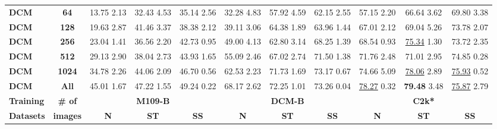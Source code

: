 \documentclass{article}
\begin{document}
\begin{table*}
\begin{tabular}{l|c|ccc|ccc|ccc}
    \noalign{\smallskip}
    \hline
    \noalign{\smallskip}
    
    \textbf{DCM} & \textbf{64}   
    & 13.75 {\tiny 2.13} 
    & 32.43 {\tiny 4.53} 
    & {35.14} {\tiny 2.56} 
    & 32.28 {\tiny 4.83} 
    & 57.92 {\tiny 4.59} 
    & {62.15} {\tiny 2.55} 
    & 57.15 {\tiny 2.20} 
    & 66.64 {\tiny 3.62} 
    & {69.80} {\tiny 3.38} \\
    \textbf{DCM} & \textbf{128}
    & 19.63 {\tiny 2.87} & {41.46} {\tiny 3.37} & 38.38 {\tiny 2.12} 
    & 39.11 {\tiny 3.06} & {64.38} {\tiny 1.89} & 63.96 {\tiny 1.44} 
    & 67.01 {\tiny 2.12} & 69.04 {\tiny 5.26} & {73.78} {\tiny 2.07} \\
    \textbf{DCM} & \textbf{256}   
    & 23.04 {\tiny 1.41} & 36.56 {\tiny 2.20} & {42.73} {\tiny 0.95} 
    & 49.00 {\tiny 4.13} & 62.80 {\tiny 3.14} & {68.25} {\tiny 1.39} 
    & 68.54 {\tiny 0.93} & {\underline{75.34}} {\tiny 1.30} & 73.72 {\tiny 2.35} \\
    \textbf{DCM} & \textbf{512}   
    & 29.13 {\tiny 2.90} & 38.04 {\tiny 2.73} & {43.93} {\tiny 1.65} 
    & 55.09 {\tiny 2.46} & 67.02 {\tiny 2.74} & {71.50} {\tiny 1.38} 
    & 71.76 {\tiny 2.48} & 71.01 {\tiny 2.95} & {74.85} {\tiny 0.28} \\
    \textbf{DCM} & \textbf{1024}   
    & 34.78 {\tiny 2.26} & 44.06 {\tiny 2.09} & {46.70} {\tiny 0.56} 
    & 62.53 {\tiny 2.23} & 71.73 {\tiny 1.69} & {73.17} {\tiny 0.67} 
    & 74.66 {\tiny 5.09} 
    & {\underline{78.06}} {\tiny 2.89} 
    & \underline{75.93} {\tiny 0.52} \\
    
    \textbf{DCM} & \textbf{All}
    & 45.01 {\tiny 1.67} & 47.22 {\tiny 1.55} & {49.24} {\tiny 0.22}	
    & 68.17 {\tiny 2.62} & 72.25 {\tiny 1.01} & {73.26} {\tiny 0.04}
    & \underline{78.27} {\tiny 0.32} & {\textbf{79.48}} {\tiny 3.48} & \underline{75.87} {\tiny 2.79} \\

    \noalign{\smallskip}
    \hline
    \noalign{\smallskip}

    \noalign{\smallskip}
    \hline
    \noalign{\smallskip}
    
    \textbf{Training} & \textbf{\# of} 
    & \multicolumn{3}{c|}{\textbf{M109-B}} 
    & \multicolumn{3}{c|}{\textbf{DCM-B}} 
    & \multicolumn{3}{c}{\textbf{C2k*}} \\
    \textbf{Datasets} & \textbf{images} 
    & \textbf{N} & \textbf{ST} & \textbf{SS}
    & \textbf{N} & \textbf{ST} & \textbf{SS}
    & \textbf{N} & \textbf{ST} & \textbf{SS} \\
    

\end{tabular}
\end{table*}
\end{document}
